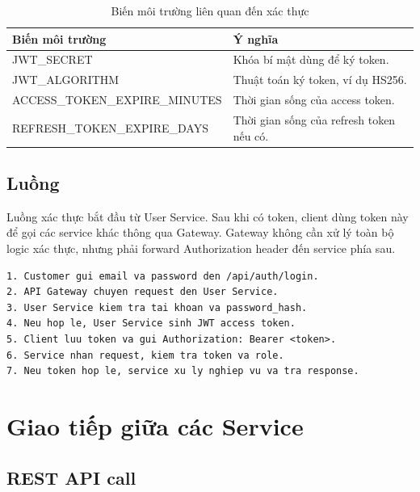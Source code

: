 \documentclass[../main.tex]{subfiles}
\begin{document}
\begin{table}[H]
    \centering
    \caption{Biến môi trường liên quan đến xác thực}
    \label{tab:chapter4-auth-env}
    \begin{tabular}{|p{}|p{}|}
        \hline
        \rowcolor{primary!35}
        \textbf{Biến môi trường} & \textbf{Ý nghĩa} \\
        \hline
        JWT\_SECRET & Khóa bí mật dùng để ký token. \\
        \hline
        JWT\_ALGORITHM & Thuật toán ký token, ví dụ HS256. \\
        \hline
        ACCESS\_TOKEN\_EXPIRE\_MINUTES & Thời gian sống của access token. \\
        \hline
        REFRESH\_TOKEN\_EXPIRE\_DAYS & Thời gian sống của refresh token nếu có. \\
        \hline
    \end{tabular}
\end{table}

\subsection{Luồng}
\label{subsection:4.4.3}

Luồng xác thực bắt đầu từ User Service. Sau khi có token, client dùng token này để gọi các service khác thông qua Gateway. Gateway không cần xử lý toàn bộ logic xác thực, nhưng phải forward Authorization header đến service phía sau.

\begin{lstlisting}[caption={Luồng đăng nhập và gọi API bằng JWT}, label={lst:chapter4-jwt-flow}]
1. Customer gui email va password den /api/auth/login.
2. API Gateway chuyen request den User Service.
3. User Service kiem tra tai khoan va password_hash.
4. Neu hop le, User Service sinh JWT access token.
5. Client luu token va gui Authorization: Bearer <token>.
6. Service nhan request, kiem tra token va role.
7. Neu token hop le, service xu ly nghiep vu va tra response.
\end{lstlisting}

\section{Giao tiếp giữa các Service}
\label{section:4.5}

\subsection{REST API call}
\label{subsection:4.5.1}
\end{document}
